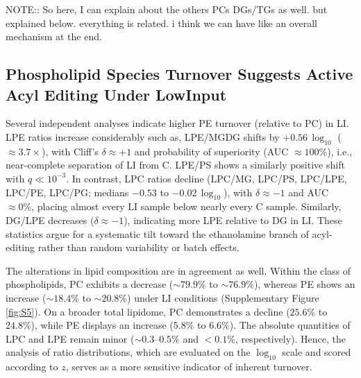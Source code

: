 \documentclass[10pt,letterpaper]{article}
\begin{document}
\begin{itemize}
NOTE:: So here, I can explain about the others PCs DGs/TGs as well. but explained below. everything is related. i think we can have like an overall mechanism at the end.  





\subsection*{Phospholipid Species Turnover Suggests Active Acyl Editing Under LowInput}

Several independent analyses indicate higher PE turnover (relative to PC) in LI. LPE ratios increase considerably such as, LPE/MGDG shifts by  $+0.56 \,\log_{10}$ ($\approx 3.7\times$), with Cliff’s $\delta \approx +1$ and probability of superiority (AUC $\approx 100\%$), i.e., near-complete separation of LI from C. LPE/PS shows a similarly positive shift with $q \ll 10^{-3}$. In contrast, LPC ratios decline (LPC/MG, LPC/PS, LPC/LPE, LPC/PE, LPC/PG; medians $-0.53$ to $-0.02 \,\log_{10}$), with 
$\delta \approx -1$ and AUC $\approx 0\%$, placing almost every LI sample below nearly every C sample. 
Similarly, DG/LPE decreases ($\delta \approx -1$), indicating more LPE relative to DG in LI. 
These statistics argue for a systematic tilt toward the ethanolamine branch of acyl-editing 
rather than random variability or batch effects.

The alterations in lipid composition are in agreement as well. Within the class of phospholipids, PC exhibits a decrease ($\sim 79.9\% $ to $ \sim 76.9\%$), whereas PE shows an increase ($\sim 18.4\% $ to $ \sim 20.8\%$) under LI conditions (Supplementary Figure \ref{fig:S5}). On a broader total lipidome, PC demonstrates a decline ($25.6\% $ to $ 24.8\%$), while PE displays an increase ($5.8\% $ to $ 6.6\%$). The absolute quantities of LPC and LPE remain minor ($\sim 0.3$–$0.5\%$ and $<0.1\%$, respectively). Hence, the analysis of ratio distributions, which are evaluated on the $\log_{10}$ scale and scored according to $z$, serves as a more sensitive indicator of inherent turnover.


\end{itemize}
\end{document}
